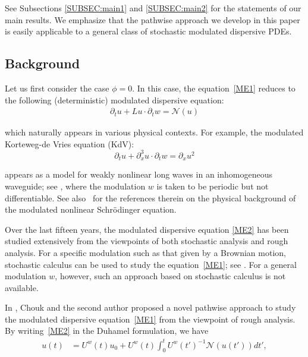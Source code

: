 \documentclass[letterpaper, 11pt,  reqno]{amsart}
\newcommand{\1}{\hspace{0.5mm}\textup{I}\hspace{0.5mm}}
\newcommand{\noi}{\noindent}
\newcommand{\dx}{\partial_x}
\newcommand{\dt}{\partial_t}
\newcommand{\NN}{\mathcal{N}}
\newcommand{\uw}{U^w}
\numberwithin{equation}{section}
\numberwithin{theorem}{section}
\begin{document}
See Subsections \ref{SUBSEC:main1}
and \ref{SUBSEC:main2}
for the statements of our main results.
We emphasize that the pathwise approach we develop
in this paper is easily applicable to a general
class of stochastic modulated dispersive PDEs.



\subsection{Background}  


Let us first   consider  the case $\phi = 0$.
In this case,  the equation~\eqref{ME1} reduces
to the following
(deterministic) modulated dispersive equation:
\begin{align}
\dt u +  L u \cdot \dt w=  \NN(u)
\label{ME2}
\end{align}


\noi
which naturally appears
in various physical contexts.
For example, 
the  modulated 
 Korteweg-de Vries equation (KdV):
\begin{equation}
\label{kdv1}
\dt u+  \dx^3 u \cdot \dt w =\dx u^2
\end{equation}

\noi
appears 
as a model 
for
weakly nonlinear long waves in an inhomogeneous waveguide;
see \cite{CMG, HZ}, where 
the modulation $w$ is taken to be periodic but not differentiable.
See also~\cite{DD, CG1}
for the references therein
on the physical background of the modulated nonlinear Schr\"odinger equation.







Over the last fifteen years, 
the modulated dispersive equation \eqref{ME2} has been studied extensively
from the viewpoints of both stochastic analysis and rough analysis.
For a specific modulation such as that given by a Brownian motion, 
stochastic calculus can be used to study 
the equation~\eqref{ME1};  see \cite{DD, DT, DR2, Ste}.
For a general modulation $w$, however, 
such an approach based on stochastic calculus
is not available.



In \cite{CG1},   %
Chouk and the second author 
proposed 
  a novel  pathwise approach 
to study the modulated dispersive equation~\eqref{ME1}
from the viewpoint of rough analysis.
By writing~\eqref{ME2} in the  Duhamel formulation, we have
\begin{align}
u(t) 
& = \uw(t) u_0 +  U^w({t}) \int_0^t U^w({t'})^{-1}\NN( u(t') ) dt', 
\label{mild1a}
\end{align}
\end{document}
